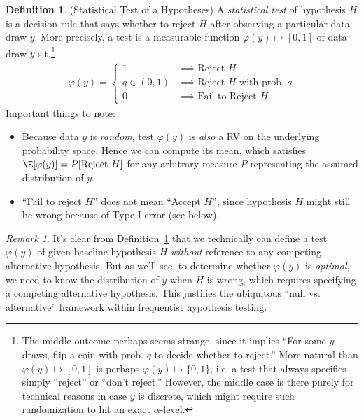 \documentclass[12pt]{article}
\theoremstyle{plain}
\theoremstyle{definition}
\newtheorem{defn}[thm]{Definition}
\theoremstyle{remark}
\newtheorem*{rmk}{Remark}
\begin{document}
\begin{defn}(Statistical Test of a Hypotheses)
\label{defn:stattest}
A \emph{statistical test} of hypothesis $H$ is a decision rule that says
whether to reject $H$ after observing a particular data draw $y$.
More precisely, a test is a measurable function
$\varphi(y)\mapsto [0,1]$ of data draw $y$ s.t.\footnote{%
  The middle outcome perhaps seems strange, since it implies ``For some
  $y$ draws, flip a coin with prob. $q$ to decide whether to reject.''
  More natural than $\varphi(y)\mapsto[0,1]$ is perhaps
  $\varphi(y)\mapsto \{0,1\}$, i.e. a test that always specifies simply
  ``reject'' or ``don't reject.''
  However, the middle case is there purely for technical reasons in case
  $y$ is discrete, which might require such randomization to hit an exact
  $\alpha$-level.
}
\begin{align}
  \varphi(y)
  =
  \begin{cases}
    1 & \implies \text{Reject $H$} \\
    q\in(0,1) & \implies \text{Reject $H$ with prob. $q$} \\
    0 & \implies \text{Fail to Reject $H$}
  \end{cases}
  \label{stattest}
\end{align}
Important things to note:
\begin{itemize}
  \item
    Because data $y$ is \emph{random}, test $\varphi(y)$ is \emph{also}
    a RV on the underlying probability space. Hence we can compute its
    mean, which satisfies $\E[\varphi(y)]=P[\text{Reject $H$}]$ for any
    arbitrary measure $P$ representing the assumed distribution of $y$.
  \item
    ``Fail to reject $H$'' does not mean ``Accept $H$'', since
    hypothesis $H$ might still be wrong because of Type I error (see
    below).
\end{itemize}
\end{defn}

\begin{rmk}
It's clear from Definition~\ref{defn:stattest} that we technically
can define a test $\varphi(y)$ of given baseline hypothesis $H$
\emph{without} reference to any competing alternative hypothesis.
But as we'll see, to determine whether $\varphi(y)$ is
\emph{optimal}, we need to know the distribution of $y$ when $H$ is
wrong, which requires specifying a competing alternative hypothesis.
This justifies the ubiquitous ``null vs.  alternative'' framework within
frequentist hypothesis testing.
\end{rmk}
\end{document}
